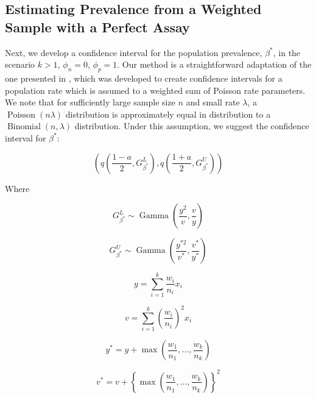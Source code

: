 \documentclass[AMA,STIX1COL]{WileyNJD-v2}
\begin{document}
\subsection{Estimating Prevalence from a Weighted Sample with a Perfect Assay}
\label{sec:weight-perfect}
Next, we develop a confidence interval for the population prevalence, \( \beta^* \), in the scenario \( k > 1 \), \( \phi_n = 0 \), \( \phi_p = 1 \).
Our method is a straightforward adaptation of the one presented in \cite{FayF:1997}, which was developed to create confidence intervals for a population rate which is assumed to a weighted sum of Poisson rate parameters.
We note that for sufficiently large sample size \( n \) and small rate \( \lambda \), a \( \operatorname{Poisson}(n\lambda) \) distribution is approximately equal in distribution to a \( \operatorname{Binomial}(n, \lambda) \) distribution.
Under this assumption, we suggest the confidence interval for \( \beta^* \):

\begin{equation}
    \left( q\left( \frac{1 - a}{2}, G_{\beta^*}^L \right), q \left( \frac{1 + a}{2},  G_{\beta^*}^U \right) \right)
\end{equation}


Where

\begin{equation}
    G_{\beta^*}^L \sim \operatorname{Gamma}\left( \frac{y^2}{v}, \frac{v}{y} \right)
\end{equation}

\begin{equation}
    G_{\beta^*}^U \sim \operatorname{Gamma}\left( \frac{y^{*2}}{v^*}, \frac{v^*}{y^*} \right)
\end{equation}

\begin{equation}
    y = \sum_{i=1}^k \frac{w_i}{n_i} x_i
\end{equation}

\begin{equation}
    v = \sum_{i=1}^k \left( \frac{w_i}{n_i}\right)^2 x_i
\end{equation}

\begin{equation}
    y^* = y + \max\left(\frac{w_1}{n_1}, \ldots, \frac{w_k}{n_k} \right)
\end{equation}

\begin{equation}
    v^* = v + \left\{ \max\left(\frac{w_1}{n_1}, \ldots, \frac{w_k}{n_k} \right) \right\}^2
\end{equation}
\end{document}
